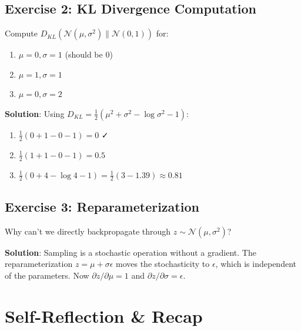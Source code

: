 \subsection{Exercise 2: KL Divergence Computation}

Compute $D_{KL}(\mathcal{N}(\mu, \sigma^2) \| \mathcal{N}(0, 1))$ for:
\begin{enumerate}
    \item $\mu = 0, \sigma = 1$ (should be 0)
    \item $\mu = 1, \sigma = 1$
    \item $\mu = 0, \sigma = 2$
\end{enumerate}

\textbf{Solution}:
Using $D_{KL} = \frac{1}{2}(\mu^2 + \sigma^2 - \log \sigma^2 - 1)$:
\begin{enumerate}
    \item $\frac{1}{2}(0 + 1 - 0 - 1) = 0$ ✓
    \item $\frac{1}{2}(1 + 1 - 0 - 1) = 0.5$
    \item $\frac{1}{2}(0 + 4 - \log 4 - 1) = \frac{1}{2}(3 - 1.39) \approx 0.81$
\end{enumerate}

\subsection{Exercise 3: Reparameterization}

Why can't we directly backpropagate through $z \sim \mathcal{N}(\mu, \sigma^2)$?

\textbf{Solution}: Sampling is a stochastic operation without a gradient. The reparameterization $z = \mu + \sigma \epsilon$ moves the stochasticity to $\epsilon$, which is independent of the parameters. Now $\partial z / \partial \mu = 1$ and $\partial z / \partial \sigma = \epsilon$.


\section{Self-Reflection \& Recap}

